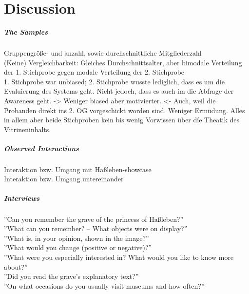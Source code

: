 \chapter{Discussion}
\label{discussion}

\paragraph{The Samples}

Gruppengröße- und anzahl, sowie durchschnittliche Mitgliederzahl
\\
(Keine) Vergleichbarkeit: Gleiches Durchschnittsalter, aber bimodale Verteilung der 1. Stichprobe gegen modale Verteilung der 2. Stichprobe
\\
1. Stichprobe war unbiased; 2. Stichprobe wusste lediglich, dass es um die Evaluierung des Systems geht. Nicht jedoch, dass es auch im die Abfrage der Awareness geht. -> Weniger biased aber motivierter. <- Auch, weil die Probanden direkt ins 2. OG vorgeschickt worden sind. Weniger Ermüdung. Alles in allem aber beide Stichproben kein bis wenig Vorwissen über díe Theatik des Vitrineninhalts. 


\paragraph{Observed Interactions}

Interaktion bzw. Umgang mit Haßleben-showcase
\\
Interaktion bzw. Umgang untereinander


\paragraph{Interviews}

''Can you remember the grave of the princess of Haßleben?''
\\
''What can you remember? -- What objects were on display?''
\\
''What is, in your opinion, shown in the image?''
\\
''What would you change (positive or negative)?''
\\
''What were you especially interested in? What would you like to know more about?''
\\
''Did you read the grave's explanatory text?''
\\
''On what occasions do you usually visit museums and how often?''

